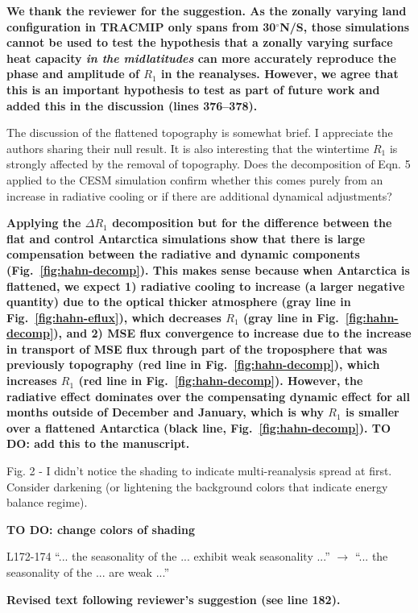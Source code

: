 \documentclass{article}
\begin{document}
\textbf{We thank the reviewer for the suggestion. As the zonally varying land configuration in TRACMIP only spans from 30$^\circ$N/S, those simulations cannot be used to test the hypothesis that a zonally varying surface heat capacity \textit{in the midlatitudes} can more accurately reproduce the phase and amplitude of $R_1$ in the reanalyses. However, we agree that this is an important hypothesis to test as part of future work and added this in the discussion (lines 376--378).}

The discussion of the flattened topography is somewhat brief. I appreciate the authors sharing their null result. It is also interesting that the wintertime $R_1$ is strongly affected by the removal of topography. Does the decomposition of Eqn. 5 applied to the CESM simulation confirm whether this comes purely from an increase in radiative cooling or if there are additional dynamical adjustments?

{\color{red}\textbf{Applying the $\Delta R_1$ decomposition but for the difference between the flat and control Antarctica simulations show that there is large compensation between the radiative and dynamic components (Fig.~\ref{fig:hahn-decomp}). This makes sense because when Antarctica is flattened, we expect 1) radiative cooling to increase (a larger negative quantity) due to the optical thicker atmosphere (gray line in Fig.~\ref{fig:hahn-eflux}), which decreases $R_1$ (gray line in Fig.~\ref{fig:hahn-decomp}), and 2) MSE flux convergence to increase due to the increase in transport of MSE flux through part of the troposphere that was previously topography (red line in Fig.~\ref{fig:hahn-decomp}), which increases $R_1$ (red line in Fig.~\ref{fig:hahn-decomp}). However, the radiative effect dominates over the compensating dynamic effect for all months outside of December and January, which is why $R_1$ is smaller over a flattened Antarctica (black line, Fig.~\ref{fig:hahn-decomp}). TO DO: add this to the manuscript.}}

Fig. 2 - I didn't notice the shading to indicate multi-reanalysis spread at first. Consider darkening (or lightening the background colors that indicate energy balance regime).

{\color{red}\textbf{TO DO: change colors of shading}}

L172-174 ``... the seasonality of the ... exhibit weak seasonality ...'' $\rightarrow$ ``... the seasonality of the ... are weak ...''

\textbf{Revised text following reviewer's suggestion (see line 182).}
\end{document}
